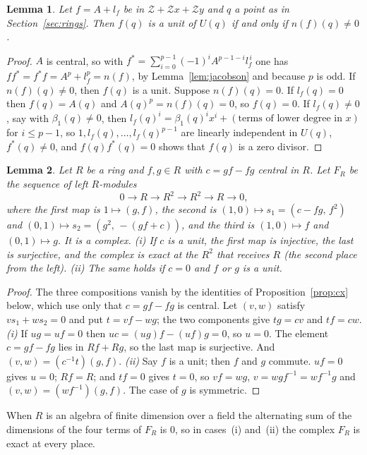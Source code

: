 \documentclass[11pt]{article}
\newtheorem{lemma}{Lemma}
\theoremstyle{definition}
\theoremstyle{remark}
\begin{document}
\begin{lemma}\label{lem:unit}
Let $f=A+l_f$ be in $\mathcal Z+\mathcal Zx+\mathcal Zy$ and $q$ a point as in Section~\ref{sec:rings}. Then $f(q)$ is a unit of $U(q)$ if and only if $n(f)(q)\ne0$.
\end{lemma}
\begin{proof}
$A$ is central, so with $f^*=\sum_{i=0}^{p-1}(-1)^iA^{p-1-i}l_f^{\,i}$ one has $ff^*=f^*f=A^p+l_f^p=n(f)$, by Lemma~\ref{lem:jacobson} and because $p$ is odd. If $n(f)(q)\ne0$, then $f(q)$ is a unit. Suppose $n(f)(q)=0$. If $l_f(q)=0$ then $f(q)=A(q)$ and $A(q)^p=n(f)(q)=0$, so $f(q)=0$. If $l_f(q)\ne0$, say with $\beta_1(q)\ne0$, then $l_f(q)^i=\beta_1(q)^ix^i+(\text{terms of lower degree in }x)$ for $i\le p-1$, so $1,l_f(q),\dots,l_f(q)^{p-1}$ are linearly independent in $U(q)$, $f^*(q)\ne0$, and $f(q)f^*(q)=0$ shows that $f(q)$ is a zero divisor.
\end{proof}

\begin{lemma}\label{lem:cplx}
Let $R$ be a ring and $f,g\in R$ with $c=gf-fg$ central in $R$. Let $F_R$ be the sequence of left $R$-modules
\begin{equation}\label{eq:FR}
0\to R\to R^2\to R^2\to R\to0,
\end{equation}
where the first map is $1\mapsto(g,f)$, the second is $(1,0)\mapsto s_1=(c-fg,\,f^2)$ and $(0,1)\mapsto s_2=(g^2,\,-(gf+c))$, and the third is $(1,0)\mapsto f$ and $(0,1)\mapsto g$.
It is a complex. \emph{(i)} If $c$ is a unit, the first map is injective, the last is surjective, and the complex is exact at the $R^2$ that receives $R$ (the second place from the left). \emph{(ii)} The same holds if $c=0$ and $f$ or $g$ is a unit.
\end{lemma}
\begin{proof}
The three compositions vanish by the identities of Proposition~\ref{prop:cx} below, which use only that $c=gf-fg$ is central. Let $(v,w)$ satisfy $vs_1+ws_2=0$ and put $t=vf-wg$; the two components give $tg=cv$ and $tf=cw$. \emph{(i)} If $ug=uf=0$ then $uc=(ug)f-(uf)g=0$, so $u=0$. The element $c=gf-fg$ lies in $Rf+Rg$, so the last map is surjective. And $(v,w)=(c^{-1}t)(g,f)$. \emph{(ii)} Say $f$ is a unit; then $f$ and $g$ commute. $uf=0$ gives $u=0$; $Rf=R$; and $tf=0$ gives $t=0$, so $vf=wg$, $v=wgf^{-1}=wf^{-1}g$ and $(v,w)=(wf^{-1})(g,f)$. The case of $g$ is symmetric.
\end{proof}
When $R$ is an algebra of finite dimension over a field the alternating sum of the dimensions of the four terms of $F_R$ is $0$, so in cases~(i) and~(ii) the complex $F_R$ is exact at every place.
\end{document}
